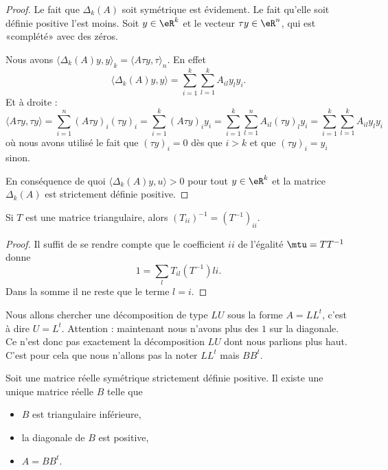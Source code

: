 \begin{proof}
    Le fait que \( \Delta_k(A)\) soit symétrique est évidement. Le fait qu'elle soit définie positive l'est moins. Soit \( y\in \eR^k\) et le vecteur \( \tau y\in \eR^n\), qui est «complété» avec des zéros.

    Nous avons \( \langle \Delta_k(A)y, y\rangle_k=\langle A\tau y, \tau \rangle_n\). En effet
    \begin{equation}
        \langle \Delta_k(A)y, y\rangle =\sum_{i=1}^k\sum_{l=1}^kA_{il}y_ly_i.
    \end{equation}
    Et à droite :
    \begin{equation}
            \langle A\tau y, \tau y\rangle =\sum_{i=1}^n(A\tau y)_i(\tau y)_i
            =\sum_{i=1}^k(A\tau y)_i y_i
            =\sum_{i=1}^k\sum_{l=1}^n A_{il}(\tau y)_ly_i
            =\sum_{i=1}^k\sum_{l=1}^k A_{il}y_ly_i
    \end{equation}
    où nous avons utilisé le fait que \( (\tau y)_i=0\) dès que \( i>k\) et que \( (\tau y)_i=y_i\) sinon.

    En conséquence de quoi \( \langle \Delta_k(A)y, u\rangle >0\) pour tout \( y\in \eR^k\) et la matrice \( \Delta_k(A)\) est strictement définie positive.
\end{proof}

\begin{lemma}       \label{LEMooLBQLooIYvacH}
    Si \( T\) est une matrice triangulaire, alors \( (T_{ii})^{-1}=(T^{-1})_{ii}\).
\end{lemma}

\begin{proof}
    Il suffit de se rendre compte que le coefficient \( ii\) de l'égalité \( \mtu=TT^{-1}\) donne
    \begin{equation}
        1=\sum_lT_{il}(T^{-1})li.
    \end{equation}
    Dans la somme il ne reste que le terme \( l=i\).
\end{proof}

Nous allons chercher une décomposition de type \( LU\) sous la forme \( A=LL^t\), c'est à dire \( U=L^t\). Attention : maintenant nous n'avons plus des \( 1\) sur la diagonale. Ce n'est donc pas exactement la décomposition \( LU\) dont nous parlions plus haut. C'est pour cela que nous n'allons pas la noter \( LL^t\) mais \( BB^t\).

\begin{theorem}
    Soit une matrice réelle symétrique strictement définie positive. Il existe une unique matrice réelle \( B\) telle que
    \begin{itemize}
        \item \( B\) est triangulaire inférieure,
        \item la diagonale de \( B\) est positive,
        \item \( A=BB^t\).
    \end{itemize}
\end{theorem}

